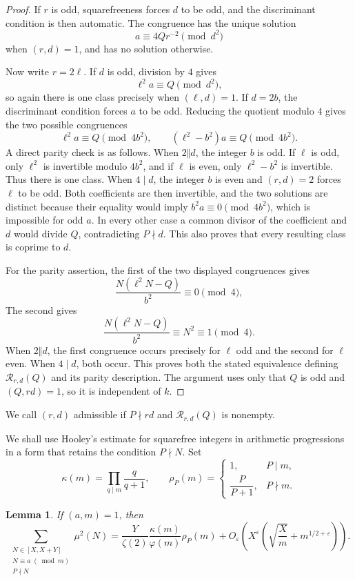 \documentclass[12pt,reqno]{amsart}
\numberwithin{equation}{section}
\theoremstyle{plain}
\newtheorem{lemma}[theorem]{Lemma}
\theoremstyle{definition}
\theoremstyle{remark}
\newcommand{\N}{\operatorname{N}}
\begin{document}
\begin{proof}
If $r$ is odd, squarefreeness forces $d$ to be odd, and the discriminant condition is then automatic.
The congruence has the unique solution
\[
a\equiv4Qr^{-2}\pmod {d^2}
\]
when $(r,d)=1$, and has no solution otherwise.

Now write $r=2\ell$.  If $d$ is odd, division by $4$ gives
\[
\ell^2a\equiv Q\pmod {d^2},
\]
so again there is one class precisely when $(\ell,d)=1$.
If $d=2b$, the discriminant condition forces $a$ to be odd.
Reducing the quotient modulo $4$ gives the two possible congruences
\[
\ell^2a\equiv Q\pmod {4b^2},
\qquad
(\ell^2-b^2)a\equiv Q\pmod {4b^2}.
\]
A direct parity check is as follows.  When $2\Vert d$, the integer $b$ is odd.
If $\ell$ is odd, only $\ell^2$ is invertible modulo $4b^2$, and if $\ell$ is even, only $\ell^2-b^2$ is
invertible.
Thus there is one class.
When $4\mid d$, the integer
$b$ is even and $(r,d)=2$ forces $\ell$ to be odd.
Both coefficients are then invertible, and the two solutions are distinct because their equality would imply $b^2a\equiv0\pmod{4b^2}$, which is impossible for odd $a$.
In every other case a common divisor of the coefficient and $d$ would divide $Q$, contradicting
$P\nmid d$.
This also proves that every resulting class is coprime to $d$.

For the parity assertion, the first of the two displayed congruences gives
\[
\frac{N(\ell^2N-Q)}{b^2}\equiv0\pmod4,
\]
The second gives
\[
\frac{N(\ell^2N-Q)}{b^2}\equiv N^2\equiv1\pmod4.
\]
When $2\Vert d$, the first congruence occurs precisely for $\ell$ odd and the second for $\ell$ even.
When $4\mid d$, both occur.
This proves both the stated equivalence defining $\mathcal R_{r,d}(Q)$ and its parity description.
The argument uses only that $Q$ is odd and
$(Q,rd)=1$, so it is independent of $k$.
\end{proof}

We call $(r,d)$ admissible if $P\nmid rd$ and
$\mathcal R_{r,d}(Q)$ is nonempty.

We shall use Hooley's estimate for squarefree integers in arithmetic progressions in a form that retains the condition $P\nmid N$.
Set
\[
\kappa(m)=\prod_{q\mid m}\frac{q}{q+1},
\qquad
\rho_P(m)=
\begin{cases}
1,&P\mid m,\\[2mm]
\dfrac{P}{P+1},&P\nmid m.
\end{cases}
\]

\begin{lemma}\label{lem:prime-deleted-hooley}
If $(a,m)=1$, then
\[
\sum_{\substack{N\in[X,X+Y]\\N\equiv a\;(\bmod m)\\P\nmid N}}
\mu^2(N)
=
\frac{Y}{\zeta(2)}
\frac{\kappa(m)}{\varphi(m)}\rho_P(m)
+
O_\varepsilon\left(
X^\varepsilon
\left(
\sqrt{\frac Xm}+m^{1/2+\varepsilon}
\right)
\right).
\]
\end{lemma}
\end{document}
